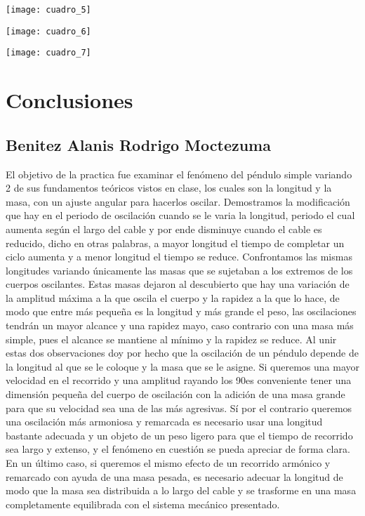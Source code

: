 \documentclass[11pt]{article}
\newenvironment{Figuras}
  {\par\medskip\noindent\minipage{\linewidth}}
  {\endminipage\par\medskip}
\begin{document}
\begin{multicols}{2}
\begin{Figuras}
	\centering
    \texttt{[image: cuadro\_5]}
	
    \label{fig:mesh59}
\end{Figuras}

\begin{Figuras}
	\centering
    \texttt{[image: cuadro\_6]}
	
    \label{fig:mesh60}
\end{Figuras}

\begin{Figuras}
	\centering
    \texttt{[image: cuadro\_7]}
	
    \label{fig:mesh61}
\end{Figuras}

\section{Conclusiones}

	\subsection{Benitez Alanis Rodrigo Moctezuma}
	El objetivo de la practica fue examinar el fenómeno del péndulo simple variando 2 de sus fundamentos teóricos vistos en clase, los cuales son la longitud y la masa, con un ajuste angular para hacerlos oscilar.
Demostramos la modificación que hay en el periodo de oscilación cuando se le varia la longitud, periodo el cual aumenta según el largo del cable y por ende disminuye cuando el cable es reducido, dicho en otras palabras, a mayor longitud el tiempo de completar un ciclo aumenta y a menor longitud el tiempo se reduce.
Confrontamos las mismas longitudes variando únicamente las masas que se sujetaban a los extremos de los cuerpos oscilantes. Estas masas dejaron al descubierto que hay una variación de la amplitud máxima a la que oscila el cuerpo y la rapidez a la que lo hace, de modo que entre más pequeña es la longitud y más grande el peso, las oscilaciones tendrán un mayor alcance y una rapidez mayo, caso contrario con una masa más simple, pues el alcance se mantiene al mínimo y la rapidez se reduce.  
Al unir estas dos observaciones doy por hecho que la oscilación de un péndulo depende de la longitud al que se le coloque y la masa que se le asigne. Si queremos una mayor velocidad en el recorrido y una amplitud rayando los 90\degree es conveniente tener una dimensión pequeña del cuerpo de oscilación con la adición de una masa grande para que su velocidad sea una de las más agresivas. Sí por el contrario queremos una oscilación más armoniosa y remarcada es necesario usar una longitud bastante adecuada y un objeto de un peso ligero para que el tiempo de recorrido sea largo y extenso, y el fenómeno en cuestión se pueda apreciar de forma clara. En un último caso, si queremos el mismo efecto de un recorrido armónico y remarcado con ayuda de una masa pesada, es necesario adecuar la longitud de modo que la masa sea distribuida a lo largo del cable y se trasforme en una masa completamente equilibrada con el sistema mecánico presentado.


\end{multicols}
\end{document}
